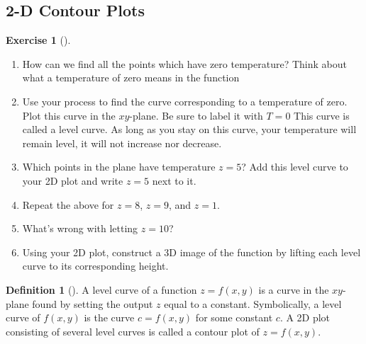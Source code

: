 \documentclass[10pt,]{book}
\theoremstyle{plain}
\theoremstyle{definition}
\newtheorem{definition}[theorem]{Definition}
\theoremstyle{definition}
\theoremstyle{definition}
\theoremstyle{definition}
\newtheorem{exploration}[project]{Exercise}
\theoremstyle{definition}
\numberwithin{equation}{section}
\begin{document}
\subsection[{2-D Contour Plots}]{2-D Contour Plots}\label{subsection-23}
\begin{exploration}[]\label{prob_intro_to_contour_plots}
\leavevmode%
\begin{enumerate}[font=\bfseries,label=(\alph*),ref=\alph*]
\item\label{task-213} How can we find all the points which have zero temperature? Think about what a temperature of zero means in the function%
%
\item\label{task-214} Use your process to find the curve corresponding to a temperature of zero. Plot this curve in the \(xy\)-plane. Be sure to label it with \(T=0\) This curve is called a level curve. As long as you stay on this curve, your temperature will remain level, it will not increase nor decrease.%
\item\label{task-215} Which points in the plane have temperature \(z=5\)?  Add this level curve to your 2D plot and write \(z=5\) next to it.%
\item\label{task-216} Repeat the above for \(z=8\), \(z=9\), and \(z=1\).  %
\item\label{task-217} What's wrong with letting \(z=10\)?%
\item\label{task-218} Using your 2D plot, construct a 3D image of the function by lifting each level curve to its corresponding height.%
\end{enumerate}
\end{exploration}
\begin{definition}[{}]\label{definition-22}
A level curve of a function \(z=f(x,y)\) is a curve in the \(xy\)-plane found by setting the output \(z\) equal to a constant. Symbolically, a level curve of \(f(x,y)\) is the curve \(c=f(x,y)\) for some constant \(c\). A 2D plot consisting of several level curves is called a contour plot of \(z=f(x,y)\).%
\end{definition}
\typeout{************************************************}
\typeout{************************************************}
\end{document}
